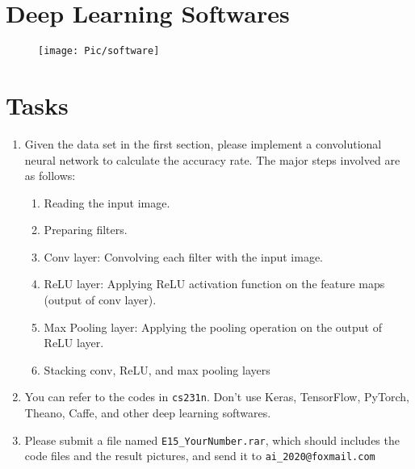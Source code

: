 \documentclass[UTF8, a4paper, 11pt]{article}
\begin{document}
\section{Deep Learning Softwares}
\begin{figure}[ht]
\centering
\texttt{[image: Pic/software]}
\end{figure}
\section{Tasks}
\begin{enumerate}
	\item Given the data set in the first section, please implement a convolutional neural network to calculate the accuracy rate. The major steps involved are as follows:
	\begin{enumerate}
		\item Reading the input image.
		\item Preparing filters.
		\item Conv layer: Convolving each filter with the input image.
		\item ReLU layer: Applying ReLU activation function on the feature maps (output of conv layer).
		\item Max Pooling layer: Applying the pooling operation on the output of ReLU layer.
		\item Stacking conv, ReLU, and max pooling layers
	\end{enumerate}
	\item You can refer to the codes in \texttt{cs231n}. Don't use Keras, TensorFlow, PyTorch, Theano, Caffe, and other deep learning softwares. 
	\item Please submit a file named \texttt{E15\_YourNumber.rar}, which should includes the code files and the result pictures, and send it to \texttt{ai\_2020@foxmail.com}
\end{enumerate}


\end{document}
